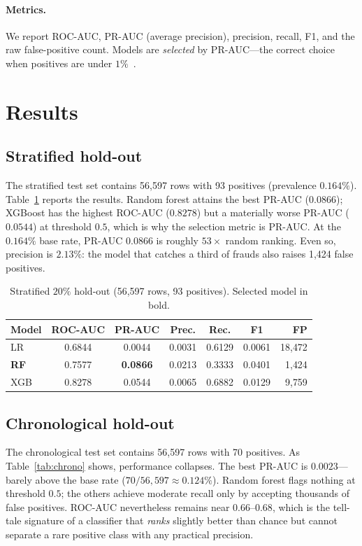 \documentclass[conference]{IEEEtran}
\begin{document}
\paragraph{Metrics.}
We report ROC-AUC, PR-AUC (average precision), precision, recall, F1, and the
raw false-positive count. Models are \emph{selected} by PR-AUC---the correct
choice when positives are under $1\%$~\cite{saito2015}.

\section{Results}
\subsection{Stratified hold-out}
The stratified test set contains 56{,}597 rows with 93 positives (prevalence
$0.164\%$). Table~\ref{tab:strat} reports the results. Random forest attains
the best PR-AUC ($0.0866$); XGBoost has the highest ROC-AUC ($0.8278$) but a
materially worse PR-AUC ($0.0544$) at threshold $0.5$, which is why the
selection metric is PR-AUC. At the $0.164\%$ base rate, PR-AUC $0.0866$ is
roughly $53\times$ random ranking. Even so, precision is $2.13\%$: the model
that catches a third of frauds also raises 1{,}424 false positives.

\begin{table}[t]
\centering
\caption{Stratified $20\%$ hold-out (56{,}597 rows, 93 positives).
Selected model in bold.}
\label{tab:strat}
\begin{tabular}{@{}lcccccr@{}}
\hline
\textbf{Model} & \textbf{ROC-AUC} & \textbf{PR-AUC} & \textbf{Prec.} &
\textbf{Rec.} & \textbf{F1} & \textbf{FP} \\
\hline
LR  & 0.6844 & 0.0044 & 0.0031 & 0.6129 & 0.0061 & 18{,}472 \\
\textbf{RF}  & 0.7577 & \textbf{0.0866} & 0.0213 & 0.3333 & 0.0401 & 1{,}424 \\
XGB & 0.8278 & 0.0544 & 0.0065 & 0.6882 & 0.0129 & 9{,}759 \\
\hline
\end{tabular}
\end{table}

\subsection{Chronological hold-out}
The chronological test set contains 56{,}597 rows with 70 positives. As
Table~\ref{tab:chrono} shows, performance collapses. The best PR-AUC is
$0.0023$---barely above the base rate ($70/56{,}597\approx 0.124\%$). Random
forest flags nothing at threshold $0.5$; the others achieve moderate recall
only by accepting thousands of false positives. ROC-AUC nevertheless remains
near $0.66$--$0.68$, which is the tell-tale signature of a classifier that
\emph{ranks} slightly better than chance but cannot separate a rare positive
class with any practical precision.
\end{document}
